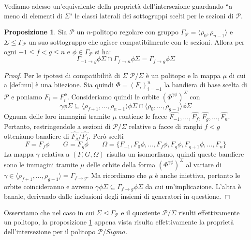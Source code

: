 \documentclass[a4paper,12pt]{report}
\newcommand{\p}{\mathcal{P}}
\theoremstyle{plain}
\theoremstyle{definition}
\newtheorem{prop}[teo]{Proposizione}
\begin{document}
Vediamo adesso un'equivalente della propriet\`a dell'intersezione guardando ``a meno di elementi di $\Sigma$" le classi laterali
dei sottogruppi scelti per le sezioni di $\p$.
\begin{prop}
\label{prop:IntersectionPropertySigma}
Sia $\p$ un $n$-politopo regolare con gruppo $\Gamma_\p=\langle\rho_0,\rho_{n-1}\rangle$ e $\Sigma\leq\Gamma_\p$ un suo sottogruppo
che agisce compatibilmente con le sezioni. Allora per ogni $-1\leq f<g\leq n$ e $\phi\in\Gamma_\p$ si ha:
\begin{equation*}
\Gamma_{-1\rightarrow g}\phi\Sigma\cap\Gamma_{f\rightarrow n}\phi\Sigma=\Gamma_{f\rightarrow g}\phi\Sigma
\end{equation*}
\end{prop}
\begin{proof}
Per le ipotesi di compatibilit\`a di $\Sigma$ $\p/\Sigma$ \`e un politopo e la mappa $\mu$ di cui a \ref{def:mu} \`e una biiezione.
Sia quindi $\Phi=(F_i)_{i=-1}^n$ la bandiera di base scelta di $\p$ e poniamo $\hat{F_i}=F_i^\phi$. Consideriamo quindi le orbite
$(\Phi^{\gamma\phi})^\Sigma$ con
\begin{equation*}
\gamma\phi\Sigma\subseteq\langle\rho_{f+1},\dots,\rho_{n-1}\rangle\phi\Sigma\cap\langle\rho_0,\dots,\rho_{g-1}\rangle\phi\Sigma
\end{equation*}
Ognuna delle loro immagini tramite $\mu$ contiene le facce $\hat{F_{-1}},\dots,\hat{F_f},\hat{F_g},\dots,\hat{F_n}$.
Pertanto, restringendole a sezioni di $\p/\Sigma$ relative a facce di ranghi $f<g$ otteniamo bandiere di $\hat{F_g}/\hat{F_f}$. Per\`o
scelti
\begin{equation*}
F=F_f\phi\qquad G=F_g\phi\qquad\Omega=\{F_{-1},F_0\phi,\dots,F_f\phi,F_g\phi,F_{g+1}\phi,\dots,F_n\}
\end{equation*}
La mappa $\gamma$ relativa a $(F,G,\Omega)$ risulta un isomorfismo, quindi queste bandiere sono le immagini tramite $\mu$ delle
orbite della forma $(\Phi^{\gamma\phi})^\Sigma$ al variare di $\gamma\in\langle\rho_{f+1},\dots,\rho_{g-1}\rangle=\Gamma_{f\rightarrow g}$.
Ma ricordiamo che $\mu$ \`e anche iniettiva, pertanto le orbite coincideranno e avremo
$\gamma\phi\Sigma\subseteq\Gamma_{f\rightarrow g}\phi\Sigma$ da cui un'implicazione. L'altra \`e banale, derivando dalle inclusioni degli
insiemi di generatori in questione.
\end{proof}
Osserviamo che nel caso in cui $\Sigma\trianglelefteq\Gamma_\p$ e il quoziente $\p/\Sigma$ risulti effettivamente un politopo, la proposizione
\ref{prop:IntersectionPropertySigma} appena vista risulta effettivamente la propriet\`a dell'intersezione per il politopo $\p/Sigma$.
\end{document}
